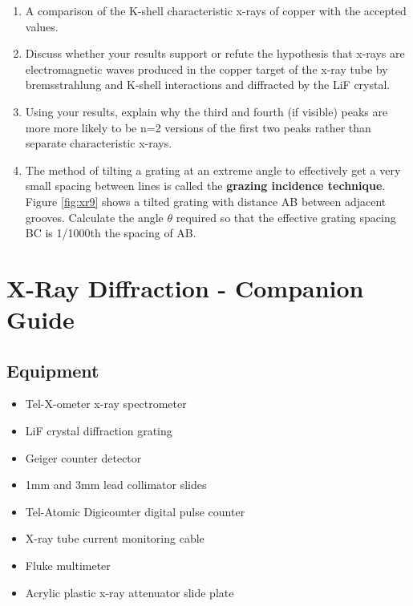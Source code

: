 \begin{enumerate}[resume]
\item A comparison of the K-shell characteristic x-rays of copper with the accepted values.

\item Discuss whether your results support or refute the hypothesis that x-rays are electromagnetic waves produced in the copper target of the x-ray tube by bremsstrahlung and K-shell interactions and diffracted by the LiF crystal.

\item Using your results, explain why the third and fourth (if visible) peaks are more more likely to be n=2 versions of the first two peaks rather than separate characteristic x-rays.

\item The method of tilting a grating at an extreme angle to effectively get a very small spacing between lines is called the {\bf grazing incidence technique}. Figure \ref{fig:xr9} shows a tilted grating with distance AB between adjacent grooves. Calculate the angle $\theta$ required so that the effective grating spacing BC is 1/1000th the spacing of AB.

\end{enumerate}


\AtEndDocument{\clearpage\ifodd\value{page}\else\null\clearpage\fi} %

%
%


\chapter{X-Ray Diffraction - Companion Guide}

\section{Equipment}

\begin{minipage}[t]{0.5\textwidth}
\begin{itemize}[noitemsep]
\item Tel-X-ometer x-ray spectrometer
\item LiF crystal diffraction grating
\item Geiger counter detector
\item 1mm and 3mm lead collimator slides
\end{itemize}
\end{minipage}
\begin{minipage}[t]{0.5\textwidth}
\begin{itemize}[noitemsep]
\item Tel-Atomic Digicounter digital pulse counter
\item X-ray tube current monitoring cable
\item Fluke multimeter
\item Acrylic plastic x-ray attenuator slide plate
\end{itemize}
\end{minipage}

